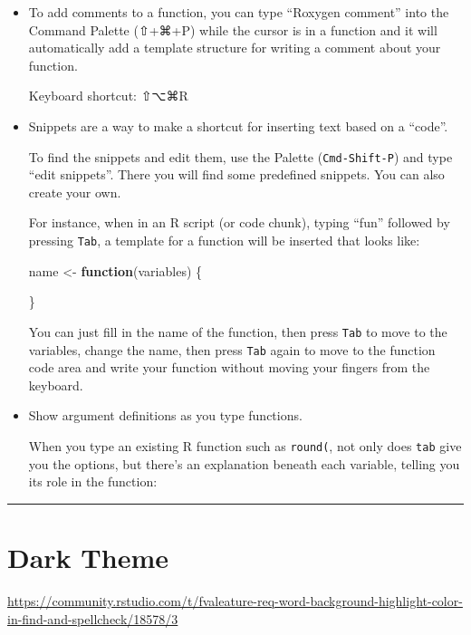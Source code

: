 \documentclass[
]{book}
\newenvironment{Shaded}{\begin{snugshade}}{\end{snugshade}}
\newcommand{\ControlFlowTok}[1]{\textcolor[rgb]{0.13,0.29,0.53}{\textbf{#1}}}
\newcommand{\NormalTok}[1]{#1}
\newcommand{\OtherTok}[1]{\textcolor[rgb]{0.56,0.35,0.01}{#1}}
\theoremstyle{definition}
\theoremstyle{definition}
\theoremstyle{definition}
\theoremstyle{definition}
\theoremstyle{remark}
\begin{document}
\begin{itemize}
\item
  To add comments to a function, you can type ``Roxygen comment'' into the Command Palette (⇧+⌘+P) while the cursor is in a function and it will automatically add a template structure for writing a comment about your function.

  Keyboard shortcut: ⇧⌥⌘R
\item
  Snippets are a way to make a shortcut for inserting text based on a ``code''.

  To find the snippets and edit them, use the Palette (\texttt{Cmd-Shift-P}) and type ``edit snippets''. There you will find some predefined snippets. You can also create your own.

  For instance, when in an R script (or code chunk), typing ``fun'' followed by pressing \texttt{Tab}, a template for a function will be inserted that looks like:

\begin{Shaded}
\begin{Highlighting}[]
\NormalTok{name }\OtherTok{\textless{}{-}} \ControlFlowTok{function}\NormalTok{(variables) \{}

\NormalTok{\}}
\end{Highlighting}
\end{Shaded}

  You can just fill in the name of the function, then press \texttt{Tab} to move to the variables, change the name, then press \texttt{Tab} again to move to the function code area and write your function without moving your fingers from the keyboard.
\item
  Show argument definitions as you type functions.

  When you type an existing R function such as \texttt{round(}, not only does {\texttt{tab}} give you the options, but there's an explanation beneath each variable, telling you its role in the function:
\end{itemize}

\begin{center}\rule{0.5\linewidth}{0.5pt}\end{center}

\section{Dark Theme}\label{dark-theme}

\url{https://community.rstudio.com/t/fvaleature-req-word-background-highlight-color-in-find-and-spellcheck/18578/3}
\end{document}
